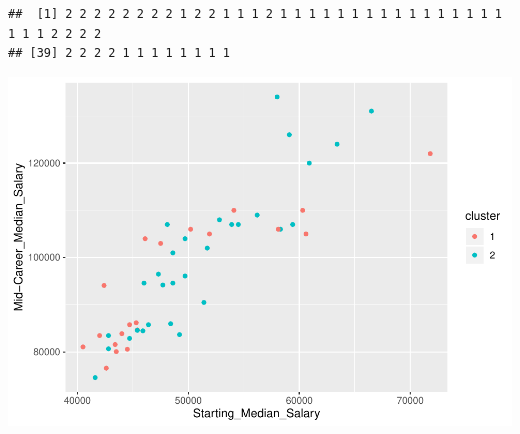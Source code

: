 \documentclass[]{article}
\newenvironment{Shaded}{\begin{snugshade}}{\end{snugshade}}
\newcommand{\KeywordTok}[1]{\textcolor[rgb]{0.13,0.29,0.53}{\textbf{#1}}}
\newcommand{\DataTypeTok}[1]{\textcolor[rgb]{0.13,0.29,0.53}{#1}}
\newcommand{\StringTok}[1]{\textcolor[rgb]{0.31,0.60,0.02}{#1}}
\newcommand{\OperatorTok}[1]{\textcolor[rgb]{0.81,0.36,0.00}{\textbf{#1}}}
\newcommand{\NormalTok}[1]{#1}
\begin{document}
\begin{verbatim}
##  [1] 2 2 2 2 2 2 2 2 1 2 2 1 1 1 2 1 1 1 1 1 1 1 1 1 1 1 1 1 1 1 1 1 1 1 2 2 2 2
## [39] 2 2 2 2 1 1 1 1 1 1 1 1
\end{verbatim}

\begin{Shaded}
\end{Shaded}

\begin{center}\includegraphics{project1_files/figure-latex/unnamed-chunk-5-4} \end{center}
\end{document}
